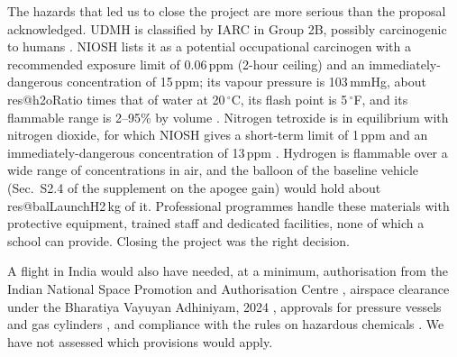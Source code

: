 \documentclass[11pt,a4paper]{article}
\makeatletter
\newcommand{\R}[1]{\csname res@#1\endcsname}
\makeatother
\begin{document}
The hazards that led us to close the project are more serious than the proposal acknowledged. UDMH is classified by IARC in Group 2B, possibly carcinogenic to humans \cite{iarc}. NIOSH lists it as a potential occupational carcinogen with a recommended exposure limit of 0.06\,ppm (2-hour ceiling) and an immediately-dangerous concentration of 15\,ppm; its vapour pressure is 103\,mmHg, about \R{h2oRatio} times that of water at 20\,$^\circ$C, its flash point is 5\,$^\circ$F, and its flammable range is 2--95\% by volume \cite{nioshudmh}. Nitrogen tetroxide is in equilibrium with nitrogen dioxide, for which NIOSH gives a short-term limit of 1\,ppm and an immediately-dangerous concentration of 13\,ppm \cite{nioshno2}. Hydrogen is flammable over a wide range of concentrations in air, and the balloon of the baseline vehicle (Sec.~S2.4 of the supplement on the apogee gain) would hold about \R{balLaunchH2}\,kg of it. Professional programmes handle these materials with protective equipment, trained staff and dedicated facilities, none of which a school can provide. Closing the project was the right decision.

A flight in India would also have needed, at a minimum, authorisation from the Indian National Space Promotion and Authorisation Centre \cite{inspace}, airspace clearance under the Bharatiya Vayuyan Adhiniyam, 2024 \cite{bva}, approvals for pressure vessels and gas cylinders \cite{peso}, and compliance with the rules on hazardous chemicals \cite{msihc}. We have not assessed which provisions would apply.
\end{document}
